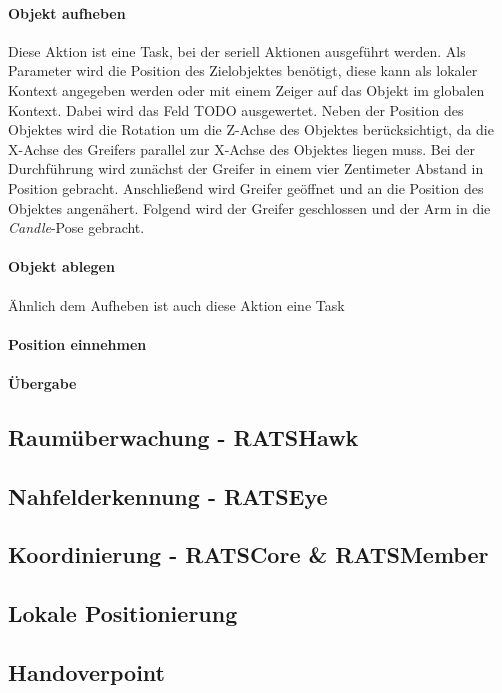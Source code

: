 \paragraph{Objekt aufheben} Diese Aktion ist eine Task, bei der seriell Aktionen ausgeführt werden. Als Parameter wird die Position des Zielobjektes benötigt, diese kann als lokaler Kontext angegeben werden oder mit einem Zeiger auf das Objekt im globalen Kontext. Dabei wird das Feld TODO ausgewertet. Neben der Position des Objektes wird die Rotation um die Z-Achse des Objektes berücksichtigt, da die X-Achse des Greifers parallel zur X-Achse des Objektes liegen muss. Bei der Durchführung wird zunächst der Greifer in einem vier Zentimeter Abstand in Position gebracht. Anschließend wird Greifer geöffnet und an die Position des Objektes angenähert. Folgend wird der Greifer geschlossen und der Arm in die \textit{Candle}-Pose gebracht.

\paragraph{Objekt ablegen} Ähnlich dem Aufheben ist auch diese Aktion eine Task
\paragraph{Position einnehmen}
\paragraph{Übergabe}

\subsection{Raumüberwachung - RATSHawk}
\subsection{Nahfelderkennung - RATSEye}
\subsection{Koordinierung - RATSCore \& RATSMember}
\subsection{Lokale Positionierung}
\subsection{Handoverpoint}
\label{sec:impl-hop}
